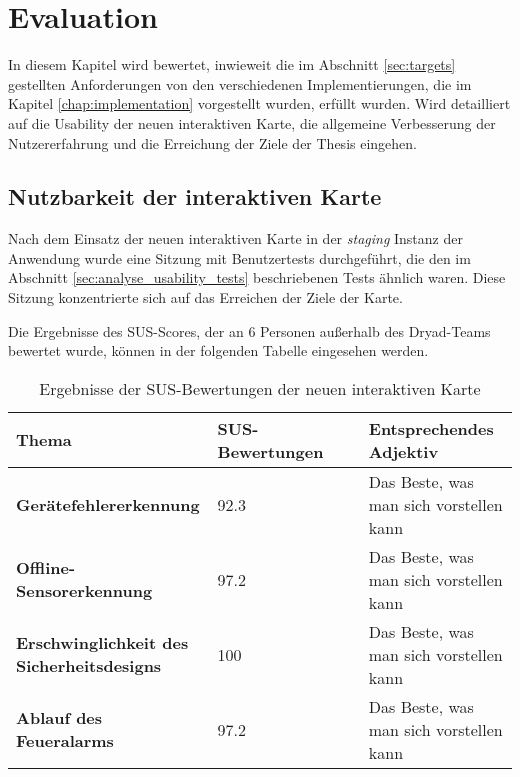\chapter{Evaluation} \label{chap:evaluation}

In diesem Kapitel wird bewertet, inwieweit die im Abschnitt \ref{sec:targets} gestellten Anforderungen von den verschiedenen Implementierungen, die im Kapitel \ref{chap:implementation} vorgestellt wurden, erfüllt wurden.
Wird detailliert auf die Usability der neuen interaktiven Karte, die allgemeine Verbesserung der Nutzererfahrung und die Erreichung der Ziele der Thesis eingehen.

\section{Nutzbarkeit der interaktiven Karte}

Nach dem Einsatz der neuen interaktiven Karte in der \textit{staging} Instanz der Anwendung wurde eine Sitzung mit Benutzertests durchgeführt, die den im Abschnitt \ref{sec:analyse_usability_tests} beschriebenen Tests ähnlich waren.
Diese Sitzung konzentrierte sich auf das Erreichen der Ziele der Karte.

Die Ergebnisse des \ac{SUS}-Scores, der an 6 Personen außerhalb des Dryad-Teams bewertet wurde, können in der folgenden Tabelle eingesehen werden.

\begin{table}[H]
  \begin{tabular}{p{0.4\linewidth} |p{0.3\linewidth}|p{0.3\linewidth}}
    Thema                                             & \ac{SUS}-Bewertungen & Entsprechendes Adjektiv                 \\ \hline\hline

    \textbf{Gerätefehlererkennung}                    & 92.3                 & Das Beste, was man sich vorstellen kann \\\hline
    \textbf{Offline-Sensorerkennung}                  & 97.2                 & Das Beste, was man sich vorstellen kann \\\hline
    \textbf{Erschwinglichkeit des Sicherheitsdesigns} & 100                  & Das Beste, was man sich vorstellen kann \\\hline
    \textbf{Ablauf des Feueralarms}                   & 97.2                 & Das Beste, was man sich vorstellen kann
  \end{tabular}
  \caption{Ergebnisse der \ac{SUS}-Bewertungen der neuen interaktiven Karte}
\end{table}

